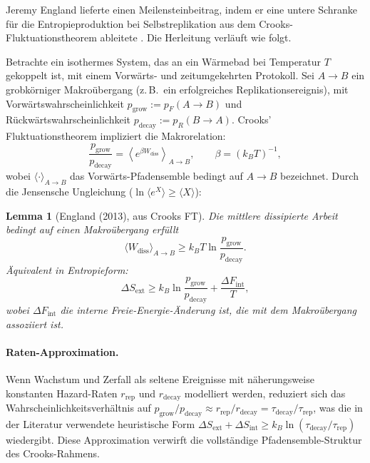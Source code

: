 \documentclass[12pt,a4paper]{article}
\newtheorem{lemma}{Lemma}
\theoremstyle{remark}
\begin{document}
Jeremy England lieferte einen Meilensteinbeitrag, indem er eine untere Schranke f\"ur die Entropieproduktion bei Selbstreplikation aus dem Crooks-Fluktuationstheorem ableitete \citep{Crooks1999,England2013}. Die Herleitung verl\"auft wie folgt.

Betrachte ein isothermes System, das an ein W\"armebad bei Temperatur $T$ gekoppelt ist, mit einem Vorw\"arts- und zeitumgekehrten Protokoll. Sei $A \to B$ ein grobk\"orniger Makro\"ubergang (z.\,B.\ ein erfolgreiches Replikationsereignis), mit Vorw\"artswahrscheinlichkeit $p_{\mathrm{grow}} := p_F(A \to B)$ und R\"uckw\"artswahrscheinlichkeit $p_{\mathrm{decay}} := p_R(B \to A)$. Crooks' Fluktuationstheorem impliziert die Makrorelation:
\begin{equation}
\frac{p_{\mathrm{grow}}}{p_{\mathrm{decay}}} = \left\langle e^{\beta W_{\mathrm{diss}}} \right\rangle_{A \to B}, \qquad \beta = (k_B T)^{-1},
\end{equation}
wobei $\langle \cdot \rangle_{A \to B}$ das Vorw\"arts-Pfadensemble bedingt auf $A \to B$ bezeichnet. Durch die Jensensche Ungleichung ($\ln \langle e^X \rangle \geq \langle X \rangle$):

\begin{lemma}[England (2013), aus Crooks FT]
\label{lem:england}
Die mittlere dissipierte Arbeit bedingt auf einen Makro\"ubergang erf\"ullt
\begin{equation}
\langle W_{\mathrm{diss}} \rangle_{A \to B} \geq k_B T \ln \frac{p_{\mathrm{grow}}}{p_{\mathrm{decay}}}.
\end{equation}
\"Aquivalent in Entropieform:
\begin{equation}
\Delta S_{\mathrm{ext}} \geq k_B \ln \frac{p_{\mathrm{grow}}}{p_{\mathrm{decay}}} + \frac{\Delta F_{\mathrm{int}}}{T},
\end{equation}
wobei $\Delta F_{\mathrm{int}}$ die interne Freie-Energie-\"Anderung ist, die mit dem Makro\"ubergang assoziiert ist.
\end{lemma}

\paragraph{Raten-Approximation.} Wenn Wachstum und Zerfall als seltene Ereignisse mit n\"aherungsweise konstanten Hazard-Raten $r_{\mathrm{rep}}$ und $r_{\mathrm{decay}}$ modelliert werden, reduziert sich das Wahrscheinlichkeitsverh\"altnis auf $p_{\mathrm{grow}} / p_{\mathrm{decay}} \approx r_{\mathrm{rep}} / r_{\mathrm{decay}} = \tau_{\mathrm{decay}} / \tau_{\mathrm{rep}}$, was die in der Literatur verwendete heuristische Form $\Delta S_{\mathrm{ext}} + \Delta S_{\mathrm{int}} \geq k_B \ln(\tau_{\mathrm{decay}} / \tau_{\mathrm{rep}})$ wiedergibt. Diese Approximation verwirft die vollst\"andige Pfadensemble-Struktur des Crooks-Rahmens.
\end{document}
